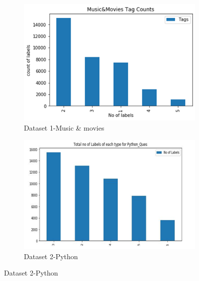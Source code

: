 \documentclass[a4paper,1pt]{article}
\begin{document}
\begin{figure}[h!]
	\captionsetup[subfigure]{labelformat=empty}
	\centering
	\begin{subfigure}[b]{0.4\linewidth}
		\includegraphics[width=0.8\linewidth]{"Precision and Recall at position 23"}
		\caption{Dataset 1-Music \& movies}
	\end{subfigure}
	\begin{subfigure}[b]{0.4\linewidth}
			\includegraphics[width=0.8\linewidth]{"Precision and Recall at position 24"}
		\caption{Dataset 2-Python}
	\end{subfigure}
\end{figure}
\end{document}
